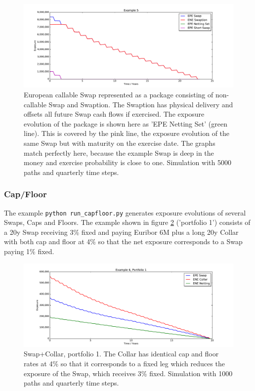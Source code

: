 \begin{figure}[hbt]
\begin{center}
\includegraphics[scale=0.45]{examples/mpl_callable_swap.pdf}
\end{center}
\caption{European callable Swap represented as a package consisting of non-callable Swap and Swaption. The Swaption has
  physical delivery and offsets all future Swap cash flows if exercised. The exposure evolution of the package is shown
  here as 'EPE Netting Set' (green line). This is covered by the pink line, the exposure evolution of the same Swap but
  with maturity on the exercise date. The graphs match perfectly here, because the example Swap is deep in the money and
  exercise probability is close to one. Simulation with 5000 paths and quarterly time steps.}
\label{fig_4}
\end{figure}

\clearpage

\subsubsection{Cap/Floor}\label{example:exposure_capfloor}

The example {\tt python run\_capfloor.py} generates exposure evolutions of several Swaps, Caps and Floors. The
example shown in figure \ref{fig_capfloor_1} ('portfolio 1') consists of a 20y Swap receiving 3\% fixed and paying
Euribor 6M plus a long 20y Collar with both cap and floor at 4\% so that the net exposure corresponds to a Swap
paying 1\% fixed. \\

\begin{figure}[h!]
\begin{center}
\includegraphics[scale=0.45]{examples/mpl_capfloor_1.pdf}
\end{center}
\caption{Swap+Collar, portfolio 1. The Collar has identical cap and floor rates at 4\% so that it corresponds to a
  fixed leg which reduces the exposure of the Swap, which receives 3\% fixed. Simulation with 1000 paths and quarterly
  time steps.}
\label{fig_capfloor_1}
\end{figure}

